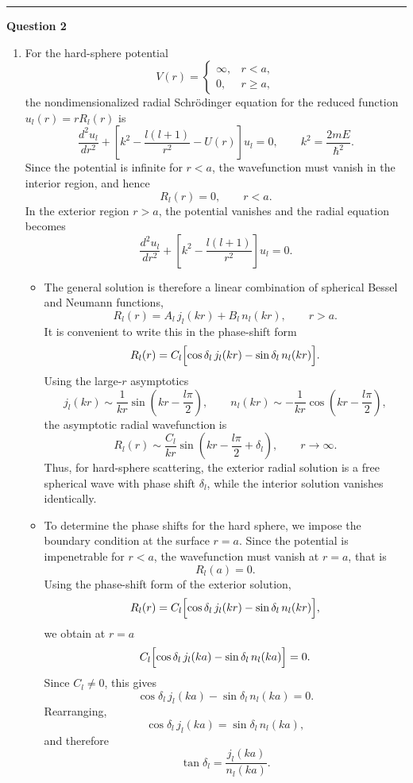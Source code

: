 \documentclass[12pt]{article}
\begin{document}
\begin{center}\rule{\linewidth}{0.4pt}\end{center}

\textbf{\large Question 2}

\begin{enumerate}[label=(\alph*)]

\item For the hard-sphere potential
\[
V(r)=
\begin{cases}
\infty, & r<a,\\[4pt]
0, & r\ge a,
\end{cases}
\]
the nondimensionalized radial Schr\"odinger equation for the reduced function \(u_l(r)=rR_l(r)\) is
\[
\frac{d^2u_l}{dr^2}+\left[k^2-\frac{l(l+1)}{r^2}-U(r)\right]u_l=0,
\qquad
k^2=\frac{2mE}{\hbar^2}.
\]
Since the potential is infinite for \(r<a\), the wavefunction must vanish in the interior region, and hence
\[
R_l(r)=0,
\qquad r<a.
\]
In the exterior region \(r>a\), the potential vanishes and the radial equation becomes
\[
\frac{d^2u_l}{dr^2}+\left[k^2-\frac{l(l+1)}{r^2}\right]u_l=0.
\]

\begin{itemize}
    \item[(i)] The general solution is therefore a linear combination of spherical Bessel and Neumann functions,
\[
R_l(r)=A_l\,j_l(kr)+B_l\,n_l(kr),
\qquad r>a.
\]
It is convenient to write this in the phase-shift form
\[
R_l(r)=C_l\Bigl[\cos\delta_l\,j_l(kr)-\sin\delta_l\,n_l(kr)\Bigr].
\]
Using the large-\(r\) asymptotics
\[
j_l(kr)\sim \frac{1}{kr}\sin\!\left(kr-\frac{l\pi}{2}\right),
\qquad
n_l(kr)\sim -\frac{1}{kr}\cos\!\left(kr-\frac{l\pi}{2}\right),
\]
the asymptotic radial wavefunction is
\[
R_l(r)\sim \frac{C_l}{kr}\sin\!\left(kr-\frac{l\pi}{2}+\delta_l\right),
\qquad r\to\infty.
\]
Thus, for hard-sphere scattering, the exterior radial solution is a free spherical wave with phase shift \(\delta_l\), while the interior solution vanishes identically.

\item[(ii)] To determine the phase shifts for the hard sphere, we impose the boundary condition at the surface \(r=a\). Since the potential is impenetrable for \(r<a\), the wavefunction must vanish at \(r=a\), that is
\[
R_l(a)=0.
\]
Using the phase-shift form of the exterior solution,
\[
R_l(r)=C_l\Bigl[\cos\delta_l\,j_l(kr)-\sin\delta_l\,n_l(kr)\Bigr],
\]
we obtain at \(r=a\)
\[
C_l\Bigl[\cos\delta_l\,j_l(ka)-\sin\delta_l\,n_l(ka)\Bigr]=0.
\]
Since \(C_l\neq 0\), this gives
\[
\cos\delta_l\,j_l(ka)-\sin\delta_l\,n_l(ka)=0.
\]
Rearranging,
\[
\cos\delta_l\,j_l(ka)=\sin\delta_l\,n_l(ka),
\]
and therefore
\[
\boxed{
\tan\delta_l=\frac{j_l(ka)}{n_l(ka)}
}.
\]


\end{itemize}
\end{enumerate}
\end{document}
